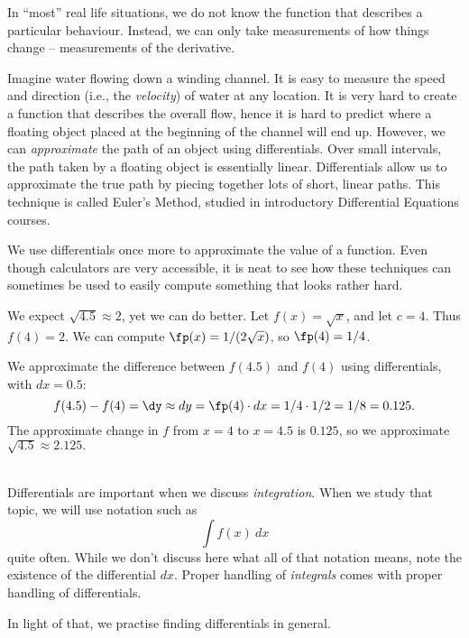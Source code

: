 In ``most'' real life situations, we do not know the function that describes a particular behaviour. Instead, we can only take measurements of how things change -- measurements of the derivative.

Imagine water flowing down a winding channel. It is easy to measure the speed and direction (i.e., the \textit{velocity}) of water at any location. It is very hard to create a function that describes the overall flow, hence it is hard to predict where a floating object placed at the beginning of the channel will end up. However, we can \textit{approximate} the path of an object using differentials. Over small intervals, the path taken by a floating object is essentially linear. Differentials allow us to approximate the true path by piecing together lots of short, linear paths. This technique is called Euler's Method, studied in introductory Differential Equations courses.

We use differentials once more to approximate the value of a function. Even though calculators are very accessible, it is neat to see how these techniques can sometimes be used to easily compute something that looks rather hard.\\


{We expect $\sqrt{4.5} \approx 2$, yet we can do better. Let $f(x) = \sqrt{x}$, and let $c=4$. Thus $f(4) = 2$. We can compute $\fp(x) = 1/(2\sqrt{x})$, so $\fp(4) = 1/4$. 

We approximate the difference between $f(4.5)$ and $f(4)$ using differentials, with $dx = 0.5$:
\[
f(4.5)-f(4) = \dy \approx dy = \fp(4)\cdot dx = 1/4 \cdot 1/2 = 1/8 = 0.125.
\]
The approximate change in $f$ from $x=4$ to $x=4.5$ is $0.125$, so we approximate $\sqrt{4.5} \approx 2.125.$
}\\

Differentials are important when we discuss \textit{integration}. When we study that topic, we will use notation such as 
\[
\int f(x)\ dx
\]
 quite often. While we don't discuss here what all of that notation means, note the existence of the differential $dx$. Proper handling of \textit{integrals} comes with proper handling of differentials. 

In light of that, we practise finding differentials in general.\\


